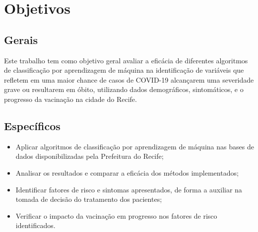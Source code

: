 \section{Objetivos}
\label{sec:objetivos}

\subsection{Gerais}
\label{subsec:objetivosgerais}

Este trabalho tem como objetivo geral avaliar a eficácia de diferentes algoritmos de classificação por aprendizagem de máquina na identificação de variáveis que refletem em uma maior chance de casos de COVID-19 alcançarem uma severidade grave ou resultarem em óbito, utilizando dados demográficos, sintomáticos, e o progresso da vacinação na cidade do Recife.

\subsection{Específicos}
\label{subsec:objetivosespecificos}

\begin{itemize}
  \item Aplicar algoritmos de classificação por aprendizagem de máquina nas bases de dados disponibilizadas pela Prefeitura do Recife;
  \item Analisar os resultados e comparar a eficácia dos métodos implementados;
  \item Identificar fatores de risco e sintomas apresentados, de forma a auxiliar na tomada de decisão do tratamento dos pacientes;
  \item Verificar o impacto da vacinação em progresso nos fatores de risco identificados.
\end{itemize}